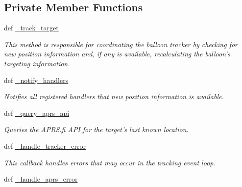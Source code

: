 \subsection*{Private Member Functions}
\begin{DoxyCompactItemize}
\item 
def \hyperlink{classhwm_1_1hardware_1_1devices_1_1drivers_1_1mxl__balloon__tracker_1_1mxl__balloon__tracker_1_1e3a9bc8b0b4bc235d39c93a5b84975bc_ae128c80439f9debdb70dccbe82e0481e}{\-\_\-track\-\_\-target}
\begin{DoxyCompactList}\small\item\em This method is responsible for coordinating the balloon tracker by checking for new position information and, if any is available, recalculating the balloon's targeting information. \end{DoxyCompactList}\item 
def \hyperlink{classhwm_1_1hardware_1_1devices_1_1drivers_1_1mxl__balloon__tracker_1_1mxl__balloon__tracker_1_1e3a9bc8b0b4bc235d39c93a5b84975bc_acba191982c497fbc853c66f68751a754}{\-\_\-notify\-\_\-handlers}
\begin{DoxyCompactList}\small\item\em Notifies all registered handlers that new position information is available. \end{DoxyCompactList}\item 
def \hyperlink{classhwm_1_1hardware_1_1devices_1_1drivers_1_1mxl__balloon__tracker_1_1mxl__balloon__tracker_1_1e3a9bc8b0b4bc235d39c93a5b84975bc_a2555cc4b9e33a06e033927a043e58897}{\-\_\-query\-\_\-aprs\-\_\-api}
\begin{DoxyCompactList}\small\item\em Queries the A\-P\-R\-S.\-fi A\-P\-I for the target's last known location. \end{DoxyCompactList}\item 
def \hyperlink{classhwm_1_1hardware_1_1devices_1_1drivers_1_1mxl__balloon__tracker_1_1mxl__balloon__tracker_1_1e3a9bc8b0b4bc235d39c93a5b84975bc_a8cf757d8d1aa61d8864715fff9911a44}{\-\_\-handle\-\_\-tracker\-\_\-error}
\begin{DoxyCompactList}\small\item\em This callback handles errors that may occur in the tracking event loop. \end{DoxyCompactList}\item 
def \hyperlink{classhwm_1_1hardware_1_1devices_1_1drivers_1_1mxl__balloon__tracker_1_1mxl__balloon__tracker_1_1e3a9bc8b0b4bc235d39c93a5b84975bc_a6bf41f223f4862f61fdcd55360ed2fbc}{\-\_\-handle\-\_\-aprs\-\_\-error}

\end{DoxyCompactItemize}
